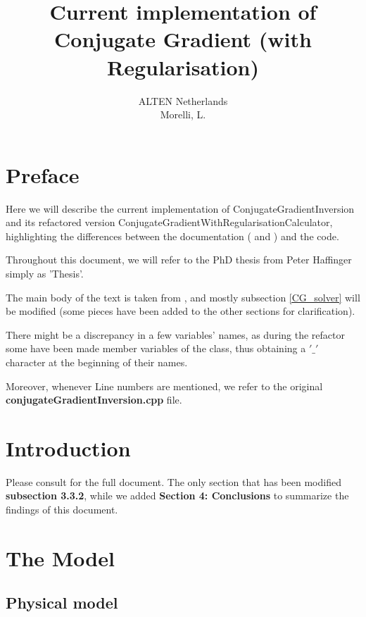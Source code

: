 \documentclass[10pt,a4paper]{article}
\title{Current implementation of Conjugate Gradient (with Regularisation)}
\author{ALTEN Netherlands\\
Morelli, L.}
\begin{document}
\maketitle
\newpage
\tableofcontents
\newpage

\clearpage
\section{Preface}
Here we will describe the current implementation of ConjugateGradientInversion and its refactored version ConjugateGradientWithRegularisationCalculator, highlighting the differences between the documentation ( \texttt{} and \newline \texttt{} ) and the code.

Throughout this document, we will refer to the PhD thesis from Peter Haffinger simply as 'Thesis'.

The main body of the text is taken from \texttt{}, and mostly subsection \ref{CG_solver} will be modified (some pieces have been added to the other sections for clarification).

There might be a discrepancy in a few variables' names, as during the refactor some have been made member variables of the class, thus obtaining a $'\_'$ character at the beginning of their names.

Moreover, whenever Line numbers are mentioned, we refer to the original \textbf{conjugateGradientInversion.cpp} file.

\section{Introduction}
Please consult  \texttt{} for the full document. 
The only section that has been modified \textbf{subsection 3.3.2}, while we added \textbf{Section 4: Conclusions} to summarize the findings of this document.

\section{The Model}
\subsection{Physical model}
\end{document}
